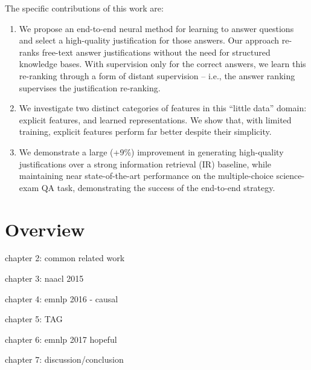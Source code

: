 The specific contributions of this work are:
\begin{enumerate}
\item We propose an end-to-end neural method for learning to answer questions and select a high-quality justification for those answers. 
Our approach re-ranks free-text answer justifications without the need for structured knowledge bases. 
With supervision only for the correct answers, we learn this re-ranking through a form of distant supervision -- i.e., the answer ranking supervises the justification re-ranking. 

\item We investigate two distinct categories of features in this ``little data'' domain: explicit features, and learned representations. We show that, with limited training, explicit features perform far better despite their simplicity. 

\item We demonstrate a large (+9\%) improvement in generating high-quality justifications over a strong information retrieval (IR) baseline, while maintaining near state-of-the-art performance on the multiple-choice science-exam QA task, demonstrating the success of the end-to-end strategy.
\end{enumerate}



\section{Overview\label{sec:overview}}

chapter 2: common related work

chapter 3: naacl 2015

chapter 4: emnlp 2016 - causal

chapter 5: TAG

chapter 6: emnlp 2017 hopeful

chapter 7: discussion/conclusion